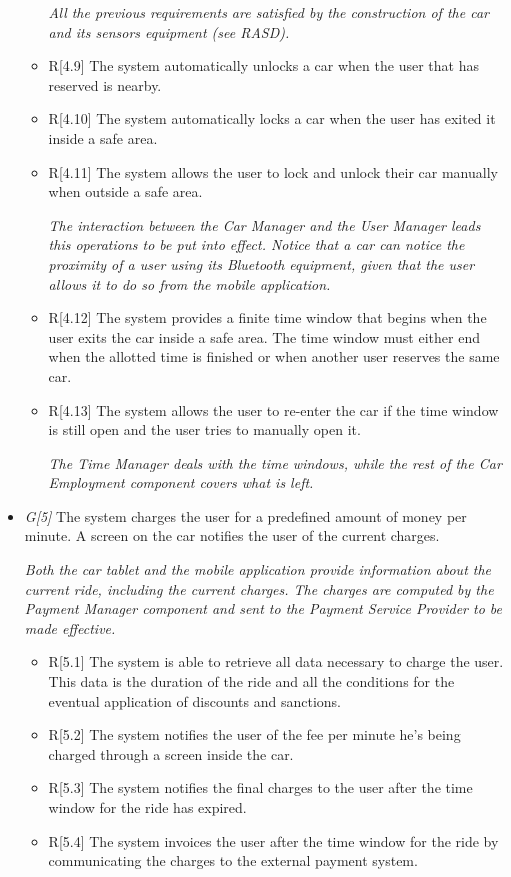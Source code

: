\begin{itemize}
\begin{itemize}
			\textit{All the previous requirements are satisfied by the construction of the car and its sensors equipment (see RASD).}

		\item R[4.9] The system automatically unlocks a car when the user that has reserved is nearby.
		\item R[4.10] The system automatically locks a car when the user has exited it inside a safe area. 
		\item R[4.11] The system allows the user to lock and unlock their car manually when outside a safe area.

			\textit{The interaction between the Car Manager and the User Manager leads this operations to be put into effect. Notice that a car can notice the proximity of a user using its Bluetooth equipment, given that the user allows it to do so from the mobile application.}

		\item R[4.12] The system provides a finite time window that begins when the user exits the car inside a safe area. The time window must either end when the allotted time is finished or when another user reserves the same car.
		\item R[4.13] The system allows the user to re-enter the car if the time window is still open and the user tries to manually open it.

			\textit{The Time Manager deals with the time windows, while the rest of the Car Employment component covers what is left.}
	\end{itemize}
	
\item \textit{G[5]} The system charges the user for a predefined amount of money per minute. A screen on the car notifies the user of the current charges.

	\textit{Both the car tablet and the mobile application provide information about the current ride, including the current charges. The charges are computed by the Payment Manager component and sent to the Payment Service Provider to be made effective.}

	\begin{itemize}
		\item R[5.1] The system is able to retrieve all data necessary to charge the user. This data is the duration of the ride and all the conditions for the eventual application of discounts and sanctions.
		\item R[5.2] The system notifies the user of the fee per minute he's being charged through a screen inside the car.
		\item R[5.3] The system notifies the final charges to the user after the time window for the ride has expired.
		\item R[5.4] The system invoices the user after the time window for the ride by communicating the charges to the external payment system. 
		

\end{itemize}
\end{itemize}
